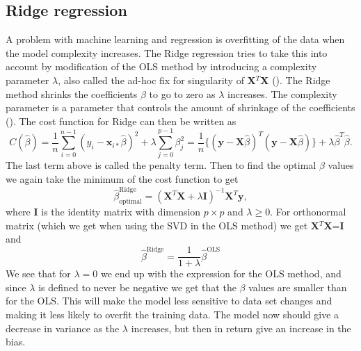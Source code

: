 \documentclass[12pt,a4paper,english]{article}
\begin{document}
\subsection{Ridge regression}
A problem with machine learning  and regression is overfitting of the data when the model complexity increases. The Ridge regression tries to take this into account by modification of the OLS method by introducing a complexity parameter $\lambda$, also called the ad-hoc fix for singularity of \textbf{X}$^T$\textbf{X} (\citet{wieringen2015}). The Ridge method shrinks the coefficients $\beta$ to go to zero as $\lambda$ increases. The complexity parameter is a parameter that controls the amount of shrinkage of the coefficients (\citet{hastie2009}). The cost function for Ridge can then be written as
\begin{equation}
\label{eq:cost_ridge}
C(\hat{\beta})=\frac{1}{n}\sum_{i=0}^{n-1}(y_i-\textbf{x}_{i*}\hat{\beta})^2+\lambda\sum_{j=0}^{p-1}\beta_j^2=\frac{1}{n}\{(\textbf{y}-\textbf{X}\hat{\beta})^T(\textbf{y}-\textbf{X}\hat{\beta})\}+\lambda\hat{\beta}^T\hat{\beta}.
\end{equation}
The last term above is called the penalty term.
Then to find the optimal $\beta$ values we again take the minimum of the cost function to get
\begin{equation}
\label{eq:beta_opt_ridge}
\hat{\beta}_{\text{optimal}}^{\text{Ridge}}=(\textbf{X}^T\textbf{X}+\lambda \textbf{I})^{-1}\textbf{X}^T\textbf{y},
\end{equation}
where \textbf{I} is the identity matrix with dimension $p\times p$ and $\lambda\geq0$. For orthonormal matrix (which we get when using the SVD in the OLS method) we get \textbf{X}$^T$\textbf{X}=\textbf{I} and
\begin{equation*}
\hat{\beta}^{\text{Ridge}}=\frac{1}{1+\lambda}\hat{\beta}^{\text{OLS}}
\end{equation*}
We see that for $\lambda=0$ we end up with the expression for the OLS method, and since $\lambda$ is defined to never be negative we get that the $\beta$ values are smaller than for the OLS. This will make the model less sensitive to data set changes and making it less likely to overfit the training data. The model now should give a decrease in variance as the $\lambda$ increases, but then in return give an increase in the bias.
\end{document}

